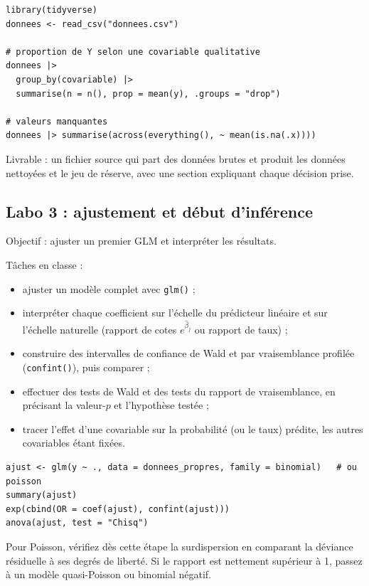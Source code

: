 \documentclass[11pt,letterpaper]{scrartcl}
\begin{document}
\begin{lstlisting}
library(tidyverse)
donnees <- read_csv("donnees.csv")

# proportion de Y selon une covariable qualitative
donnees |>
  group_by(covariable) |>
  summarise(n = n(), prop = mean(y), .groups = "drop")

# valeurs manquantes
donnees |> summarise(across(everything(), ~ mean(is.na(.x))))
\end{lstlisting}

Livrable : un fichier source qui part des données brutes et produit les données nettoyées et le jeu de réserve, avec une section expliquant chaque décision prise.

\subsection{Labo 3 : ajustement et début d'inférence}

Objectif : ajuster un premier GLM et interpréter les résultats.

Tâches en classe :
\begin{itemize}
  \item ajuster un modèle complet avec \texttt{glm()} ;
  \item interpréter chaque coefficient sur l'échelle du prédicteur linéaire et sur l'échelle naturelle (rapport de cotes $e^{\hat\beta_j}$ ou rapport de taux) ;
  \item construire des intervalles de confiance de Wald et par vraisemblance profilée (\texttt{confint()}), puis comparer ;
  \item effectuer des tests de Wald et des tests du rapport de vraisemblance, en précisant la valeur-$p$ et l'hypothèse testée ;
  \item tracer l'effet d'une covariable sur la probabilité (ou le taux) prédite, les autres covariables étant fixées.
\end{itemize}

\begin{lstlisting}
ajust <- glm(y ~ ., data = donnees_propres, family = binomial)   # ou poisson
summary(ajust)
exp(cbind(OR = coef(ajust), confint(ajust)))
anova(ajust, test = "Chisq")
\end{lstlisting}

\begin{envremarque}
Pour Poisson, vérifiez dès cette étape la surdispersion en comparant la déviance résiduelle à ses degrés de liberté. Si le rapport est nettement supérieur à 1, passez à un modèle quasi-Poisson ou binomial négatif.
\end{envremarque}
\end{document}
